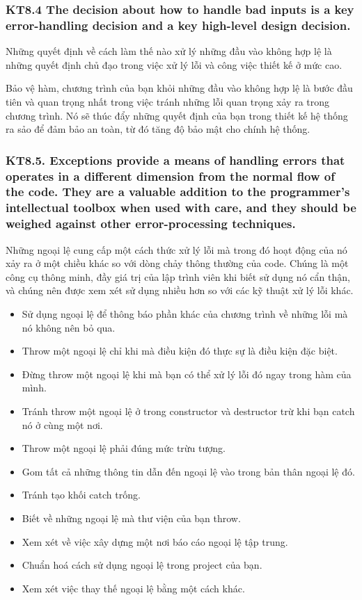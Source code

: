 \documentclass[12pt]{report}
\begin{document}
\subsubsection{KT8.4 The decision about how to handle bad inputs is a key error-handling decision and a key high-level design decision.}
Những quyết định về cách làm thế nào xử lý những đầu vào không hợp lệ là những quyết định chủ đạo trong việc xử lý lỗi và công việc thiết kế ở mức cao. 
\vspace*{3mm}

Bảo vệ hàm, chương trình của bạn khỏi những đầu vào không hợp lệ là bước đầu tiên và quan trọng nhất trong việc tránh những lỗi quan trọng xảy ra trong chương trình. Nó sẽ thúc đẩy những quyết định của bạn trong thiết kế hệ thống ra sảo để đảm bảo an toàn, từ đó tăng độ bảo mật cho chính hệ thống. 

\subsubsection{KT8.5. Exceptions provide a means of handling errors that operates in a different dimension from the normal flow of the code. They are a valuable addition to the programmer's intellectual toolbox when used with care, and they should be weighed against other error-processing techniques.}
Những ngoại lệ cung cấp một cách thức xử lý lỗi mà trong đó hoạt động của nó xảy ra ở một chiều khác so với dòng chảy thông thường của code. Chúng là một công cụ thông minh, đầy giá trị của lập trình viên khi biết sử dụng nó cẩn thận, và chúng nên được xem xét sử dụng nhiều hơn so với các kỹ thuật xử lý lỗi khác. 
\vspace*{3mm}

\begin{itemize}
	\item Sử dụng ngoại lệ để thông báo phần khác của chương trình về những lỗi mà nó không nên bỏ qua.
	\item Throw một ngoại lệ chỉ khi mà điều kiện đó thực sự là điều kiện đặc biệt. 
	\item Đừng throw một ngoại lệ khi mà bạn có thể xử lý lỗi đó ngay trong hàm của mình. 
	\item Tránh throw một ngoại lệ ở trong constructor và destructor trừ khi bạn catch nó ở cùng một nơi. 
	\item Throw một ngoại lệ phải đúng mức trừu tượng. 
	\item Gom tất cả những thông tin dẫn đến ngoại lệ vào trong bản thân ngoại lệ đó. 
	\item Tránh tạo khối catch trống. 
	\item Biết về những ngoại lệ mà thư viện của bạn throw. 
	\item Xem xét về việc xây dựng một nơi báo cáo ngoại lệ tập trung. 
	\item Chuẩn hoá cách sử dụng ngoại lệ trong project của bạn. 
	\item Xem xét việc thay thế ngoại lệ bằng một cách khác. 
\end{itemize} 
\end{document}
